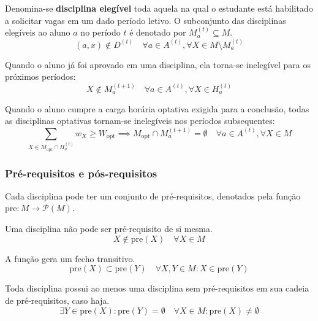 \documentclass[
    12pt,
    openany,
    oneside,
    a4paper,
    english,
    brazil
]{abntex2}
\begin{document}
Denomina-se \textbf{disciplina elegível} toda aquela na qual o estudante está habilitado a solicitar vagas em um dado período letivo. O subconjunto das disciplinas elegíveis ao aluno $a$ no período $t$ é denotado por $M_a^{(t)} \subseteq M$.
\begin{equation}
    (a, x) \notin D^{(t)} 
    \quad \forall a \in A^{(t)}, \forall X \in M \setminus M_a^{(t)}
\end{equation}

Quando o aluno já foi aprovado em uma disciplina, ela torna-se inelegível para os próximos períodos:
\begin{equation}
    X \notin M_a^{(t + 1)} 
    \quad \forall a \in A^{(t)}, \forall X \in H_a^{(t)}
\end{equation}

Quando o aluno cumpre a carga horária optativa exigida para a conclusão, todas as disciplinas optativas tornam-se inelegíveis nos períodos subsequentes:
\begin{equation}
    \sum_{X \in M_\text{opt} \cap H_a^{(t)}} w_{X} \geq W_\text{opt} \implies M_\text{opt} \cap M_a^{(t + 1)} = \emptyset
    \quad \forall a \in A^{(t)}, \forall X \in M
\end{equation}

\subsubsection{Pré-requisitos e pós-requisitos}

Cada disciplina pode ter um conjunto de pré-requisitos, denotados pela função $\mathrm{pre}: M \xrightarrow{} \mathcal{P}(M)$. 

Uma disciplina não pode ser pré-requisito de si mesma.
\begin{equation}
    X \notin \mathrm{pre}(X) \quad \forall X \in M
\end{equation}

A função gera um fecho transitivo.
\begin{equation}
     \mathrm{pre}(X) \subset \mathrm{pre}(Y) \quad \forall X, Y \in M : X \in  \mathrm{pre}(Y)
\end{equation}

Toda disciplina possui ao menos uma disciplina sem pré-requisitos em sua cadeia de pré-requisitos, caso haja.
\begin{equation}
     \exists Y \in \mathrm{pre}(X) : \mathrm{pre}(Y) = \emptyset \quad \forall X \in M : \mathrm{pre}(X) \neq \emptyset
\end{equation}
\end{document}
